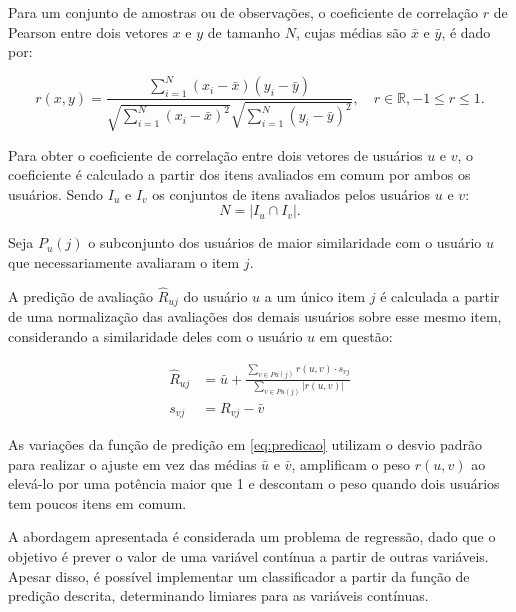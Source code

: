 Para um conjunto de amostras ou de observações, o coeficiente de
correlação $r$ de Pearson entre dois vetores $x$ e $y$ de tamanho $N$, cujas
médias são $\bar{x}$ e $\bar{y}$, é dado por:

\begin{equation}    
    r(x,y) = \frac{\sum_{i=1}^{N}(x_i - \bar{x})(y_i - \bar{y})}{\sqrt{\sum_{i=1}^{N}(x_i - \bar{x})^2} \sqrt{\sum_{i=1}^{N}(y_i - \bar{y})^2}}, \quad r \in \mathbb{R}, -1 \leq r \leq 1.
\end{equation}

Para obter o coeficiente de correlação entre dois vetores de usuários $u$ e $v$,
o coeficiente é calculado a partir dos itens avaliados em comum por ambos os
usuários. Sendo $I_u$ e $I_v$ os conjuntos de itens avaliados pelos usuários $u$ e $v$:
\begin{equation}
    N = |I_u \cap I_v|.
\end{equation}

Seja $P_u (j)$ o subconjunto dos usuários de maior similaridade com o usuário
$u$ que necessariamente avaliaram o item $j$.

A predição de avaliação
$\hat{R}_{uj}$ do usuário $u$ a um único item $j$ é calculada a partir de uma
normalização das avaliações dos demais usuários sobre esse mesmo item,
considerando a similaridade deles com o usuário $u$ em questão:

\begin{align}
    \label{eq:predicao}
\hat{R}_{uj} &= \bar{u} + \frac{\sum_{v \in Pu(j)} r(u,v) \cdot s_{vj}}{\sum_{v \in Pu(j)} |r(u,v)|} \\
s_{vj} &= R_{vj} - \bar{v}
\end{align}

As variações da função de predição em \ref{eq:predicao} utilizam o desvio padrão
para realizar o ajuste em vez das médias $\bar{u}$ e $\bar{v}$, amplificam o
peso $r(u,v)$ ao elevá-lo por uma potência maior que 1 e descontam o peso quando
dois usuários tem poucos itens em comum.

A abordagem apresentada é considerada um problema de regressão, dado que o objetivo é prever
o valor de uma variável contínua a partir de outras variáveis. Apesar disso, é
possível implementar um classificador a partir da função de predição descrita,
determinando limiares para as variáveis contínuas.

